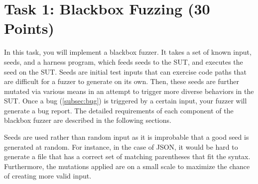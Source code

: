 \documentclass[letterpaper,11pt]{article}
\begin{document}

\section{Task 1: Blackbox Fuzzing (30 Points)}
\label{sec:blackbox}



In this task, you will implement a blackbox fuzzer.
It takes a set of known input, seeds, and a harness program, which feeds seeds to the SUT, and executes the seed on the SUT.
Seeds are initial test inputs that can exercise code paths that are difficult for a fuzzer to generate on its own.
Then, these seeds are further mutated via various means in an attempt to trigger more diverse behaviors in the SUT.
Once a bug (\autoref{subsec:bug}) is triggered by a certain input, your fuzzer will generate a bug report. The detailed requirements of each component of the blackbox fuzzer are described in the following sections.

Seeds are used rather than random input as it is improbable that a good seed is generated at random.
For instance, in the case of JSON, it would be hard to generate a file that has a correct set of matching parentheses that fit the syntax.
Furthermore, the mutations applied are on a small scale to maximize the chance of creating more valid input.

\end{document}
